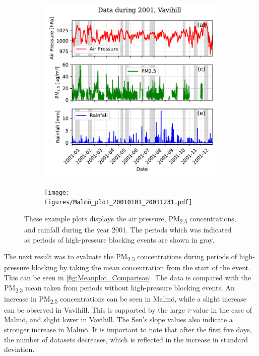 \begin{figure}[H]
    \centering
    \begin{subfigure}[b]{0.49\textwidth}
        \centering
        \includegraphics[width=\textwidth]{Figures/Vavihill_plot_20010101_20011231.pdf}
        \label{fig:2001Vavihill}
    \end{subfigure}
    \hfill
    \begin{subfigure}[b]{0.49\textwidth}
        \centering
        \texttt{[image: Figures/Malmö\_plot\_20010101\_20011231.pdf]}
        \label{fig:2001Malmö}
    \end{subfigure}
    \caption{These example plots displays the air pressure, PM\textsubscript{2.5} concentrations, and rainfall during the year 2001. The periods which was indicated as periods of high-pressure blocking events are shown in gray. }
    \label{fig:2001}
\end{figure}

The next result was to evaluate the PM\textsubscript{2.5} concentrations during periods of high-pressure blocking by taking the mean concentration from the start of the event. This can be seen in \autoref{fig:Meanplot_Comparison}. The data is compared with the PM\textsubscript{2.5} mean taken from periods without high-pressure blocking events. An increase in PM\textsubscript{2.5} concentrations can be seen in Malmö, while a slight increase can be observed in Vavihill. This is supported by the large $\tau$-value in the case of Malmö, and slight lower in Vavihill. The Sen's slope values also indicate a stronger increase in Malmö. It is important to note that after the first five days, the number of datasets decreases, which is reflected in the increase in standard deviation.


